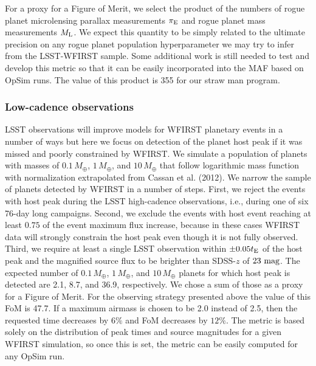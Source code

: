 For a proxy for a Figure of Merit, we select the product of the numbers of
rogue planet microlensing parallax measurements $\pi_{\rm E}$
and rogue planet mass measurements $M_{\rm L}$.
We expect this quantity to be simply related to the ultimate precision
on any rogue planet population hyperparameter we may try to infer from
the LSST-WFIRST sample.
Some additional
work is still needed to test and develop this metric so that it can be easily incorporated into the MAF based on OpSim runs.
The value of this product is 355 for our straw man program.


\subsubsection{Low-cadence observations}

LSST observations will improve models for WFIRST planetary events
in a number of ways but here we focus on detection of the planet
host peak if it was missed and poorly constrained by WFIRST. We simulate
a population of planets with masses of $0.1\,M_\oplus$, $1\,M_\oplus$,
and $10\,M_\oplus$ that follow logarithmic mass function with
normalization extrapolated from Cassan et al. (2012). We narrow the sample of
planets detected by WFIRST in a number of steps. First, we reject the events
with host peak during the LSST high-cadence observations, i.e., during one of six
76-day long campaigns. Second, we exclude the events with host event reaching
at least $0.75$ of the event maximum flux increase, because in these cases WFIRST
data will strongly constrain the host peak even though it is not fully observed.
Third, we require at least a single LSST observation within $\pm0.05t_{\rm E}$ of
the host peak and the magnified source flux to be brighter than SDSS-$z$ of $23~{\rm mag}$.
The expected number of $0.1\,M_\oplus$, $1\,M_\oplus$, and $10\,M_\oplus$
planets for which host peak is detected are 2.1, 8.7, and 36.9, respectively.
We chose a sum of those as a proxy for a Figure of Merit. For the observing strategy
presented above the value of this FoM is 47.7. If a maximum airmass is chosen to be
2.0 instead of 2.5, then the requested time decreases by $6\%$ and FoM decreases by $12\%$.
The metric is based solely on the distribution of peak times and source magnitudes
for a given WFIRST simulation, so once this is set, the metric can
be easily computed for any OpSim run.



